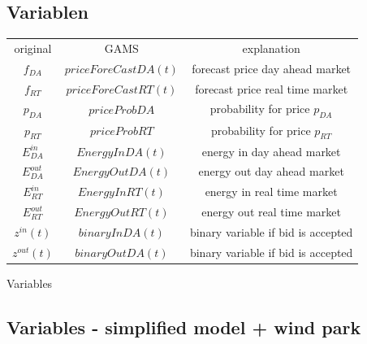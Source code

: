 \documentclass{article}
\begin{document}
\subsection{Variablen}
    \centering
    \begin{tabular}{c|c|c}
            original & GAMS & explanation \\
         $f_{DA}$ & $priceForeCastDA(t)$ & forecast price day ahead market\\
         $f_{RT}$ & $priceForeCastRT(t)$ &  forecast price real time market\\

         $p_{DA}$ & $ priceProbDA $ & probability for price $p_{DA}$ \\
         $p_{RT}$ & $ priceProbRT $ & probability for price $p_{RT}$ \\
         
         $E^{in}_{DA}$ & $EnergyInDA(t)$ & energy in day ahead market \\
         $E^{out}_{DA}$ & $EnergyOutDA(t)$ & energy out day ahead market \\

         $E^{in}_{RT}$ & $EnergyInRT(t)$ & energy in real time market \\
         $E^{out}_{RT}$ & $EnergyOutRT(t)$ & energy out  real time market \\

         $z^{in}(t)$ & $binaryInDA(t)$ & binary variable if bid is accepted\\
         $z^{out}(t)$ & $binaryOutDA(t)$ & binary variable if bid is accepted\\


    \end{tabular}
    \caption{Variables}
    \label{tab:my_label}





\subsection{Variables - simplified model + wind park}
\end{document}
